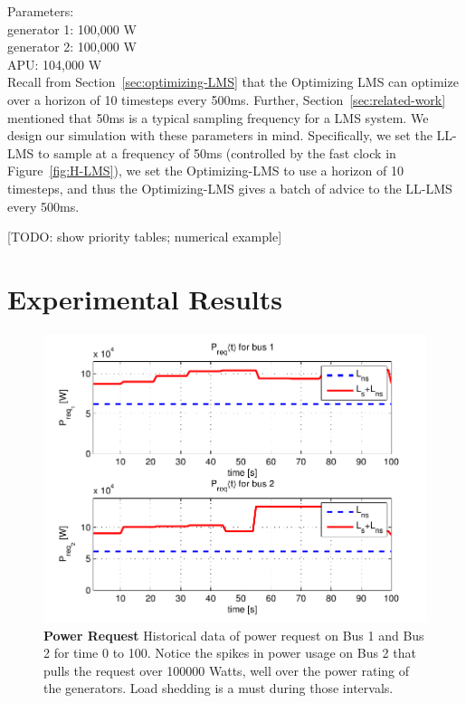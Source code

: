 \documentclass{acm_proc_article-sp}
\begin{document}
Parameters: \\
generator 1: 100,000 W \\
generator 2: 100,000 W \\
APU: 104,000 W \\

Recall from Section~\ref{sec:optimizing-LMS} that the Optimizing LMS can optimize over a horizon of 10 timesteps every 500ms. 
Further, Section~\ref{sec:related-work} mentioned that 50ms is a typical sampling frequency for a LMS system.
We design our simulation with these parameters in mind.
Specifically, we set the LL-LMS to sample at a frequency of 50ms (controlled by the fast clock in Figure~\ref{fig:H-LMS}), we set the Optimizing-LMS to use a horizon of 10 timesteps, and thus the Optimizing-LMS gives a batch of advice to the LL-LMS every 500ms.

[TODO: show priority tables; numerical example]

\section{Experimental Results}
\label{sec:results}
\begin{figure}[htb]
  \centering
  \includegraphics[width=\columnwidth]{figures/preqnofail}
  \caption{\textbf{Power Request}
  Historical data of power request on Bus 1 and Bus 2 for time 0
  to 100. Notice the spikes in power usage on Bus 2 that pulls the
  request over 100000 Watts, well over the power rating of the generators.
  Load shedding is a must during those intervals.}
  \label{fig:preqnofail}
\end{figure}
\end{document}
